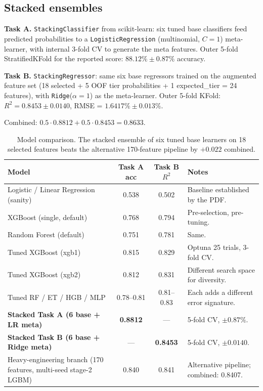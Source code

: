 \documentclass[11pt,a4paper]{article}
\begin{document}
\subsection*{Stacked ensembles}

\textbf{Task A.} \texttt{StackingClassifier} from scikit-learn: six tuned base classifiers feed predicted probabilities to a \texttt{LogisticRegression} (multinomial, $C=1$) meta-learner, with internal 3-fold CV to generate the meta features. Outer 5-fold StratifiedKFold for the reported score: $88.12\% \pm 0.87\%$ accuracy.

\textbf{Task B.} \texttt{StackingRegressor}: same six base regressors trained on the augmented feature set (18 selected + 5 OOF tier probabilities + 1 expected\_tier = 24 features), with \texttt{Ridge}($\alpha=1$) as the meta-learner. Outer 5-fold KFold: $R^2 = 0.8453 \pm 0.0140$, RMSE = $1.6417\% \pm 0.013\%$.

Combined: $0.5 \cdot 0.8812 + 0.5 \cdot 0.8453 = \mathbf{0.8633}$.

\begin{table}[h]
\centering
\small
\begin{tabular}{p{4.5cm}ccp{6.5cm}}
\toprule
\textbf{Model} & \textbf{Task A acc} & \textbf{Task B $R^2$} & \textbf{Notes} \\
\midrule
Logistic / Linear Regression (sanity) & 0.538 & 0.502 & Baseline established by the PDF. \\
XGBoost (single, default) & 0.768 & 0.794 & Pre-selection, pre-tuning. \\
Random Forest (default) & 0.751 & 0.781 & Same. \\
Tuned XGBoost (xgb1) & 0.815 & 0.829 & Optuna 25 trials, 3-fold CV. \\
Tuned XGBoost (xgb2) & 0.812 & 0.831 & Different search space for diversity. \\
Tuned RF / ET / HGB / MLP & 0.78--0.81 & 0.81--0.83 & Each adds a different error signature. \\
\textbf{Stacked Task A (6 base + LR meta)} & \textbf{0.8812} & --- & 5-fold CV, $\pm 0.87\%$. \\
\textbf{Stacked Task B (6 base + Ridge meta)} & --- & \textbf{0.8453} & 5-fold CV, $\pm 0.0140$. \\
\midrule
Heavy-engineering branch (170 features, multi-seed stage-2 LGBM) & 0.840 & 0.841 & Alternative pipeline; combined: 0.8407. \\
\bottomrule
\end{tabular}
\caption{Model comparison. The stacked ensemble of six tuned base learners on 18 selected features beats the alternative 170-feature pipeline by $+0.022$ combined.}
\label{tab:models}
\end{table}
\end{document}
